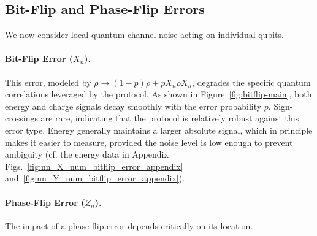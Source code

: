 \subsection{Bit-Flip and Phase-Flip Errors}
\label{subsec:quantum-channel-errors}

We now consider local quantum channel noise acting on individual qubits.

\paragraph{Bit-Flip Error ($X_n$).} This error, modeled by $\rho \rightarrow (1-p)\rho + pX_n\rho X_n$, degrades the specific quantum correlations leveraged by the protocol. As shown in Figure~\ref{fig:bitflip-main}, both energy and charge signals decay smoothly with the error probability $p$. Sign-crossings are rare, indicating that the protocol is relatively robust against this error type. Energy generally maintains a larger absolute signal, which in principle makes it easier to measure, provided the noise level is low enough to prevent ambiguity (cf. the energy data in Appendix Figs.~\ref{fig:nn_X_num_bitflip_error_appendix} and~\ref{fig:nn_Y_num_bitflip_error_appendix}).

\paragraph{Phase-Flip Error ($Z_n$).} The impact of a phase-flip error depends critically on its location.


